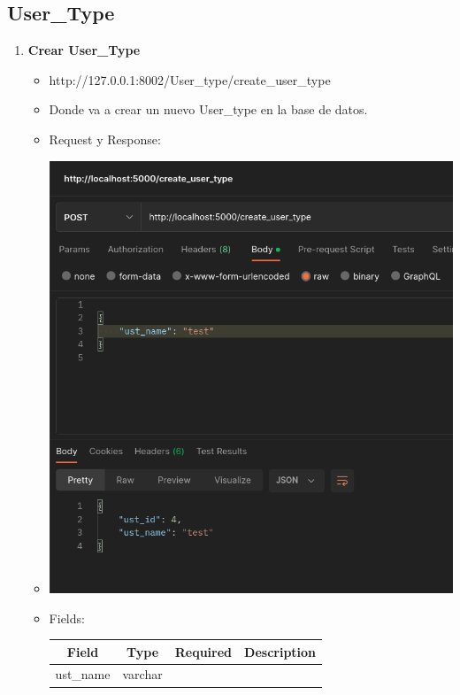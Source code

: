 \documentclass{article}
\begin{document}

\subsection{User\_Type}
\begin{enumerate}
    \item \textbf{Crear User\_Type}
    \begin{itemize}
        \item http://127.0.0.1:8002/User\_type/create\_user\_type
        \item Donde va a crear un nuevo User\_type en la base de datos.
        \item Request y Response:
        \item \includegraphics[scale=.5]{assets/user_type/create_user_type.png}
        \item Fields:
        \begin{table}[H] \centering \begin{tabular}{|l|l|l|l|} \hline
        \multicolumn{1}{|c|}{\textbf{Field}} &
        \multicolumn{1}{c|}{\textbf{Type}} &
        \multicolumn{1}{c|}{\textbf{Required}} &
        \multicolumn{1}{c|}{\textbf{Description}} \\ \hline ust\_name & varchar

\end{tabular}
\end{table}
\end{itemize}
\end{enumerate}
\end{document}
